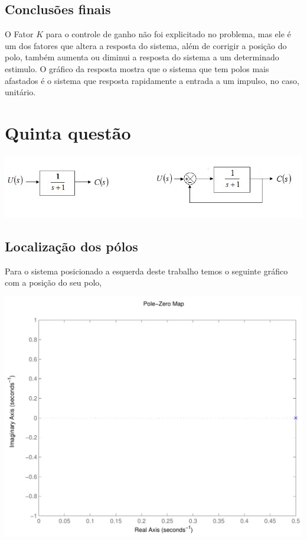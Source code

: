 \documentclass[paper=a4, fontsize=11pt]{article}
\begin{document}
\subsection{Conclusões finais}

O Fator $K$ para o controle de ganho não foi explicitado no problema, mas ele é um dos 
fatores que altera a resposta do sistema, além de corrigir a posição do polo, também
aumenta ou diminui a resposta do sistema a um determinado estimulo. O gráfico da resposta
mostra que o sistema que tem polos mais afastados é o sistema que resposta rapidamente
a entrada a um impulso, no caso, unitário. 

\section{Quinta questão}

\begin{center}
    \includegraphics[scale=0.5]{q5.png}
\end{center}

\subsection{Localização dos pólos}

Para o sistema posicionado a esquerda deste trabalho temos o seguinte gráfico 
com a posição do seu polo,

\begin{center}
    \includegraphics[scale=0.5]{q5iama.pdf}
\end{center}
\end{document}
